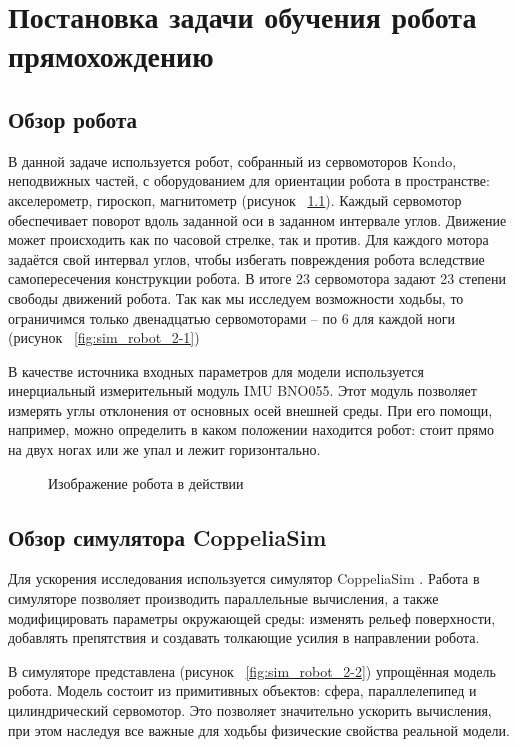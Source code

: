 \chapter{Постановка задачи обучения робота прямохождению}\label{ch:ch1}
\section{Обзор робота}\label{sec:ch1/sec1}
В данной задаче используется робот, собранный из сервомоторов Kondo,  неподвижных частей, с оборудованием для ориентации робота в пространстве: акселерометр, гироскоп, магнитометр (рисунок ~\cref{fig:real_robot}). Каждый сервомотор обеспечивает поворот вдоль заданной оси в заданном интервале углов. Движение может происходить как по часовой стрелке, так и против. Для каждого мотора задаётся свой интервал углов, чтобы избегать повреждения робота вследствие самопересечения конструкции робота. В итоге 23 сервомотора задают 23 степени свободы движений робота. Так как мы исследуем возможности ходьбы, то ограничимся только двенадцатью сервомоторами – по 6 для каждой ноги (рисунок ~\cref{fig:sim_robot_2-1})

В качестве источника входных параметров для модели используется инерциальный измерительный модуль IMU BNO055. Этот модуль позволяет измерять углы отклонения от основных осей внешней среды. При его помощи, например, можно определить в каком положении находится робот: стоит прямо на двух ногах или же упал и лежит горизонтально.

\begin{figure}[ht]
    \caption[Изображение робота в действии]{Изображение робота в действии}\label{fig:real_robot}
\end{figure}
\section{Обзор симулятора CoppeliaSim}\label{sec:ch1/sec1}

Для ускорения исследования используется симулятор CoppeliaSim \cite{coppeliaSim}. Работа в симуляторе позволяет производить параллельные вычисления, а также модифицировать параметры окружающей среды: изменять рельеф поверхности, добавлять препятствия и создавать толкающие усилия в направлении робота. 

В симуляторе представлена (рисунок ~\cref{fig:sim_robot_2-2}) упрощённая модель робота. Модель состоит из примитивных объектов: сфера, параллелепипед и цилиндрический сервомотор. Это позволяет значительно ускорить вычисления, при этом наследуя все важные для ходьбы физические свойства реальной модели.

